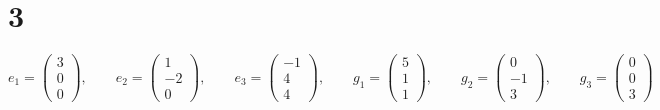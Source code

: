 \section{3}

$$ e_1 =
\begin{pmatrix}
	3 \\
    0 \\
    0
\end{pmatrix}, \qquad e_2 =
\begin{pmatrix}
	1 \\
    -2 \\
    0
\end{pmatrix}, \qquad e_3 =
\begin{pmatrix}
	-1 \\
    4 \\
    4
\end{pmatrix}, \qquad g_1 =
\begin{pmatrix}
	5 \\
    1 \\
    1
\end{pmatrix}, \qquad g_2 =
\begin{pmatrix}
	0 \\
    -1 \\
    3
\end{pmatrix}, \qquad g_3 =
\begin{pmatrix}
	0 \\
    0 \\
    3
\end{pmatrix} $$
